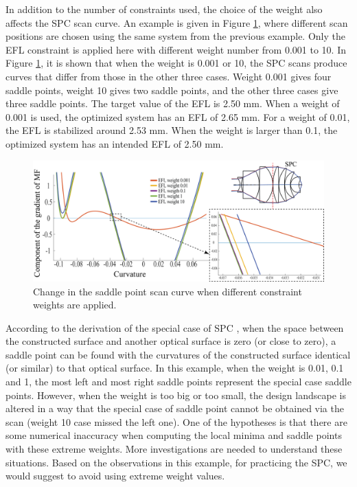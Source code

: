 In addition to the number of constraints used, the choice of the weight also affects the SPC scan curve. An example is given in Figure \ref{fig: vollrath_wt_change}, where different scan positions are chosen using the same system from the previous example. Only the EFL constraint is applied here with different weight number from 0.001 to 10. In Figure \ref{fig: vollrath_wt_change}, it is shown that when the weight is 0.001 or 10, the SPC scans produce curves that differ from those in the other three cases. Weight 0.001 gives four saddle points, weight 10 gives two saddle points, and the other three cases give three saddle points. The target value of the EFL is 2.50 mm. When a weight of 0.001 is used, the optimized system has an EFL of 2.65 mm. For a weight of 0.01, the EFL is stabilized around 2.53 mm. When the weight is larger than 0.1, the optimized system has an intended EFL of 2.50 mm. 
\begin{figure}[h!]
    \centering
    \includegraphics[width=\textwidth]{chapter-4/figures/Vollrath_wt_change.png}
    \caption{Change in the saddle point scan curve when different constraint weights are applied.}
    \label{fig: vollrath_wt_change}
\end{figure}

According to the derivation of the special case of SPC \cite{BociortSPCSexplained}, when the space between the constructed surface and another optical surface is zero (or close to zero), a saddle point can be found with the curvatures of the constructed surface identical (or similar) to that optical surface. In this example, when the weight is 0.01, 0.1 and 1, the most left and most right saddle points represent the special case saddle points. However, when the weight is too big or too small, the design landscape is altered in a way that the special case of saddle point cannot be obtained via the scan (weight 10 case missed the left one). One of the hypotheses is that there are some numerical inaccuracy when computing the local minima and saddle points with these extreme weights. More investigations are needed to understand these situations. Based on the observations in this example, for practicing the SPC, we would suggest to avoid using extreme weight values. 

